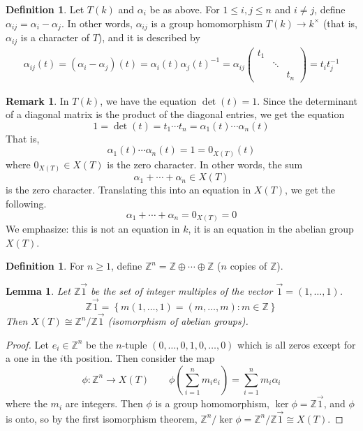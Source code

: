 \documentclass[12pt]{article}
\newtheorem{lemma}[theorem]{Lemma}
\theoremstyle{definition}
\newtheorem{definition}[theorem]{Definition}
\newtheorem{remark}[theorem]{Remark}
\newcommand{\Z}{\mathbb{Z}}
\newcommand{\lp}{\left(}
\newcommand{\rp}{\right)}
\newcommand{\lb}{\left\{}
\newcommand{\rb}{\right\}}
\newcommand{\inv}{^{-1}}
\newcommand{\iso}{\cong}
\begin{document}
\begin{definition}
Let $T(k)$ and $\alpha_i$ be as above. For $1 \le i,j \le n$ and $i \neq j$, define $\alpha_{ij} = \alpha_i - \alpha_j$. In other words, $\alpha_{ij}$ is a group homomorphism $T(k) \to k^\times$ (that is, $\alpha_{ij}$ is a character of $T$), and it is described by
\begin{align*}
	\alpha_{ij}(t) = (\alpha_i - \alpha_j)(t) = \alpha_i(t) \alpha_j(t) \inv = 
	\alpha_{ij}
	\begin{pmatrix}
		t_1 \\
		& \ddots \\
		&& t_n
	\end{pmatrix} = t_i t_j \inv
\end{align*}
\end{definition}

\begin{remark}
In $T(k)$, we have the equation $\det(t) = 1$. Since the determinant of a diagonal matrix is the product of the diagonal entries, we get the equation
\[
	1 = \det(t) = t_1 \cdots t_n = \alpha_1(t) \cdots \alpha_n(t)
\]
That is,
\[
	\alpha_1(t) \cdots \alpha_n(t) = 1 = 0_{X(T)}(t)
\]
where $0_{X(T)} \in X(T)$ is the zero character. In other words, the sum
\[
	\alpha_1 + \cdots + \alpha_n \in X(T)
\]
is the zero character. Translating this into an equation in $X(T)$, we get the following.
\[
	\alpha_1 + \cdots + \alpha_n = 0_{X(T)} = 0
\]
We emphasize: this is not an equation in $k$, it is an equation in the abelian group $X(T)$.
\end{remark}

\begin{definition}
For $n \ge 1$, define $\Z^n = \Z \oplus \cdots \oplus \Z$ ($n$ copies of $\Z$).
\end{definition}

\begin{lemma}
Let $\Z \vec 1$ be the set of integer multiples of the vector $\vec 1 = (1, \ldots, 1)$.
\[
	\Z \vec 1 = \lb m(1, \ldots, 1) = (m, \ldots, m) : m \in \Z \rb
\]
Then $X(T) \iso \Z^n / \Z \vec 1$ (isomorphism of abelian groups).
\end{lemma}
\begin{proof}
Let $e_i \in \Z^{n}$ be the $n$-tuple $(0, \ldots, 0, 1, 0, \ldots, 0)$ which is all zeros except for a one in the $i$th position. Then consider the map
\[
	\phi:\Z^n \to X(T) \qquad \phi \lp \sum_{i=1}^n m_i e_i \rp = \sum_{i=1}^n m_i \alpha_i
\]
where the $m_i$ are integers. Then $\phi$ is a group homomorphism, $\ker \phi = \Z \vec 1$, and $\phi$ is onto, so by the first isomorphism theorem, $\Z^n / \ker \phi = \Z^n / \Z \vec 1 \iso X(T)$.
\end{proof}
\end{document}
